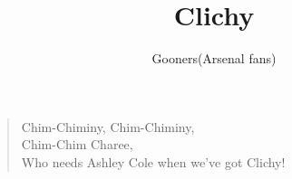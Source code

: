\documentclass[a4paper,12pt]{article}
\title{Clichy}
\author{Gooners(Arsenal fans)}
\date{}
\begin{document}
	
	\maketitle
	
	\begin{verse}
		
		Chim-Chiminy, Chim-Chiminy, \\
		Chim-Chim Charee, \\
		Who needs Ashley Cole when we've got Clichy!
		
	\end{verse}
	
\end{document}
